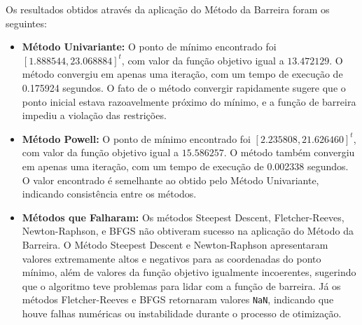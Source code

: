 \documentclass[a4paper, 12pt]{article}
\begin{document}
Os resultados obtidos através da aplicação do Método da Barreira foram os seguintes:

\begin{itemize}
    \item \textbf{Método Univariante:} O ponto de mínimo encontrado foi \([1.888544, 23.068884]^t\), com valor da função objetivo igual a \(13.472129\). O método convergiu em apenas uma iteração, com um tempo de execução de 0.175924 segundos. O fato de o método convergir rapidamente sugere que o ponto inicial estava razoavelmente próximo do mínimo, e a função de barreira impediu a violação das restrições.

    \item \textbf{Método Powell:} O ponto de mínimo encontrado foi \([2.235808, 21.626460]^t\), com valor da função objetivo igual a \(15.586257\). O método também convergiu em apenas uma iteração, com um tempo de execução de 0.002338 segundos. O valor encontrado é semelhante ao obtido pelo Método Univariante, indicando consistência entre os métodos.

    \item \textbf{Métodos que Falharam:} Os métodos Steepest Descent, Fletcher-Reeves, Newton-Raphson, e BFGS não obtiveram sucesso na aplicação do Método da Barreira. O Método Steepest Descent e Newton-Raphson apresentaram valores extremamente altos e negativos para as coordenadas do ponto mínimo, além de valores da função objetivo igualmente incoerentes, sugerindo que o algoritmo teve problemas para lidar com a função de barreira. Já os métodos Fletcher-Reeves e BFGS retornaram valores \texttt{NaN}, indicando que houve falhas numéricas ou instabilidade durante o processo de otimização.
\end{itemize}

\begin{table}[H]
\centering
{}
\caption{Resultados dos Métodos de Barreira e Otimização Sem Restrições}
\end{table}
\end{document}
